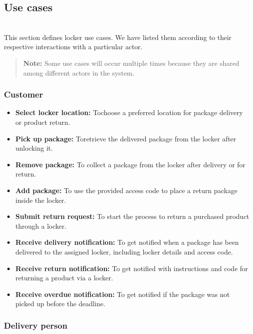 \subsection{Use cases}\label{UUHa-1klk8FSwQJ7u5PuP}
\\
This section defines locker use cases. We have listed them according to their respective interactions with a particular actor.
\begin{quote}
\textbf{Note:} Some use cases will occur multiple times because they are shared among different actors in the system.
\end{quote}
\subsubsection{Customer}\label{I8o3iKF7m3wpKlbGSCcys}

\begin{itemize}
\item
\protect{}\label{eCsS9jUuagLJnhh9_1Ngg}
\textbf{Select locker location:} Tochoose a preferred location for package delivery or product return.
\item
\textbf{Pick up package:} Toretrieve the delivered package from the locker after unlocking it.
\item
\textbf{Remove package:} To collect a package from the locker after delivery or for return.
\item
\textbf{Add package:} To use the provided access code to place a return package inside the locker.
\item
\textbf{Submit return request:} To start the process to return a purchased product through a locker.
\item
\textbf{Receive delivery notification:} To get notified when a package has been delivered to the assigned locker, including locker details and access code.
\item
\textbf{Receive return notification:} To get notified with instructions and code for returning a product via a locker.
\item
\protect{}\label{eCsS9jUuagLJnhh9_1Ngg}
\textbf{Receive overdue notification:} To get notified if the package was not picked up before the deadline.
\end{itemize}

\subsubsection{Delivery person}\label{nexBjcJkJ7gShhOIgvIVa}

